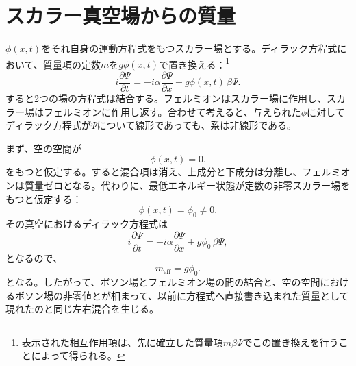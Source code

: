 \section{スカラー真空場からの質量}

\begin{classroomqa}
\end{classroomqa}

\(\phi(x,t)\)をそれ自身の運動方程式をもつスカラー場とする。ディラック方程式において、質量項の定数\(m\)を\(g\phi(x,t)\)で置き換える：\footnote{表示された相互作用項は、先に確立した質量項\(m\beta\Psi\)でこの置き換えを行うことによって得られる。}
\begin{equation}
i\frac{\partial\Psi}{\partial t}
=
-i\alpha\frac{\partial\Psi}{\partial x}
+g\phi(x,t)\,\beta\Psi.
\end{equation}
すると2つの場の方程式は結合する。フェルミオンはスカラー場に作用し、スカラー場はフェルミオンに作用し返す。合わせて考えると、与えられた\(\phi\)に対してディラック方程式が\(\Psi\)について線形であっても、系は非線形である。

まず、空の空間が
\begin{equation}
\phi(x,t)=0.
\end{equation}
をもつと仮定する。すると混合項は消え、上成分と下成分は分離し、フェルミオンは質量ゼロとなる。代わりに、最低エネルギー状態が定数の非零スカラー場をもつと仮定する：
\begin{equation}
\phi(x,t)=\phi_0\neq0.
\end{equation}
その真空におけるディラック方程式は
\begin{equation}
i\frac{\partial\Psi}{\partial t}
=
-i\alpha\frac{\partial\Psi}{\partial x}
+g\phi_0\,\beta\Psi,
\end{equation}
となるので、
\begin{equation}
m_{\mathrm{eff}}=g\phi_0.
\end{equation}
となる。したがって、ボソン場とフェルミオン場の間の結合と、空の空間におけるボソン場の非零値とが相まって、以前に方程式へ直接書き込まれた質量として現れたのと同じ左右混合を生じる。

\begin{classroomqa}
\end{classroomqa}

